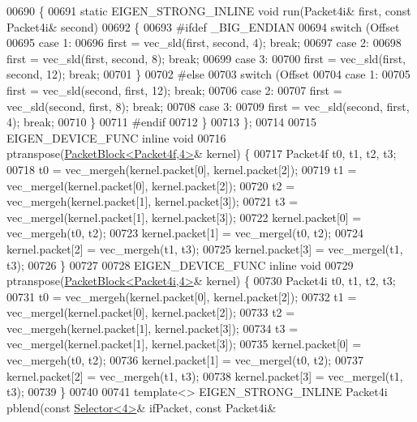 \begin{DoxyCode}
{00690 \{
00691   \textcolor{keyword}{static} EIGEN\_STRONG\_INLINE \textcolor{keywordtype}{void} run(Packet4i& first, \textcolor{keyword}{const} Packet4i& second)
00692   \{
00693 \textcolor{preprocessor}{#ifdef \_BIG\_ENDIAN}
00694     \textcolor{keywordflow}{switch} (Offset %
00695     \textcolor{keywordflow}{case} 1:
00696       first = vec\_sld(first, second, 4); \textcolor{keywordflow}{break};
00697     \textcolor{keywordflow}{case} 2:
00698       first = vec\_sld(first, second, 8); \textcolor{keywordflow}{break};
00699     \textcolor{keywordflow}{case} 3:
00700       first = vec\_sld(first, second, 12); \textcolor{keywordflow}{break};
00701     \}
00702 \textcolor{preprocessor}{#else}
00703     \textcolor{keywordflow}{switch} (Offset %
00704     \textcolor{keywordflow}{case} 1:
00705       first = vec\_sld(second, first, 12); \textcolor{keywordflow}{break};
00706     \textcolor{keywordflow}{case} 2:
00707       first = vec\_sld(second, first, 8); \textcolor{keywordflow}{break};
00708     \textcolor{keywordflow}{case} 3:
00709       first = vec\_sld(second, first, 4); \textcolor{keywordflow}{break};
00710     \}
00711 \textcolor{preprocessor}{#endif}
00712   \}
00713 \};
00714 
00715 EIGEN\_DEVICE\_FUNC \textcolor{keyword}{inline} \textcolor{keywordtype}{void}
00716 ptranspose(\hyperlink{struct_eigen_1_1internal_1_1_packet_block}{PacketBlock<Packet4f,4>}& kernel) \{
00717   Packet4f t0, t1, t2, t3;
00718   t0 = vec\_mergeh(kernel.packet[0], kernel.packet[2]);
00719   t1 = vec\_mergel(kernel.packet[0], kernel.packet[2]);
00720   t2 = vec\_mergeh(kernel.packet[1], kernel.packet[3]);
00721   t3 = vec\_mergel(kernel.packet[1], kernel.packet[3]);
00722   kernel.packet[0] = vec\_mergeh(t0, t2);
00723   kernel.packet[1] = vec\_mergel(t0, t2);
00724   kernel.packet[2] = vec\_mergeh(t1, t3);
00725   kernel.packet[3] = vec\_mergel(t1, t3);
00726 \}
00727 
00728 EIGEN\_DEVICE\_FUNC \textcolor{keyword}{inline} \textcolor{keywordtype}{void}
00729 ptranspose(\hyperlink{struct_eigen_1_1internal_1_1_packet_block}{PacketBlock<Packet4i,4>}& kernel) \{
00730   Packet4i t0, t1, t2, t3;
00731   t0 = vec\_mergeh(kernel.packet[0], kernel.packet[2]);
00732   t1 = vec\_mergel(kernel.packet[0], kernel.packet[2]);
00733   t2 = vec\_mergeh(kernel.packet[1], kernel.packet[3]);
00734   t3 = vec\_mergel(kernel.packet[1], kernel.packet[3]);
00735   kernel.packet[0] = vec\_mergeh(t0, t2);
00736   kernel.packet[1] = vec\_mergel(t0, t2);
00737   kernel.packet[2] = vec\_mergeh(t1, t3);
00738   kernel.packet[3] = vec\_mergel(t1, t3);
00739 \}
00740 
00741 \textcolor{keyword}{template}<> EIGEN\_STRONG\_INLINE Packet4i pblend(\textcolor{keyword}{const} \hyperlink{struct_eigen_1_1internal_1_1_selector}{Selector<4>}& ifPacket, \textcolor{keyword}{const} Packet4i& 
}
\end{DoxyCode}
